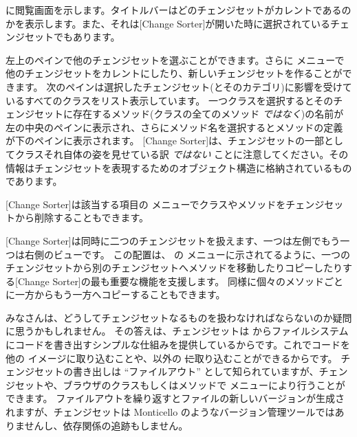 \documentclass[a4paper,10pt,twoside]{book}
\begin{document}
 に閲覧画面を示します。タイトルバーはどのチェンジセットがカレントであるのかを表示します。また、それは[Change Sorter]が開いた時に選択されているチェンジセットでもあります。

左上のペインで他のチェンジセットを選ぶことができます。さらに \actclick メニューで他のチェンジセットをカレントにしたり、新しいチェンジセットを作ることができます。
次のペインは選択したチェンジセット(とそのカテゴリ)に影響を受けているすべてのクラスをリスト表示しています。
一つクラスを選択するとそのチェンジセットに存在するメソッド(クラスの全てのメソッド \emph{ではなく})の名前が左の中央のペインに表示され、さらにメソッド名を選択するとメソッドの定義が下のペインに表示されます。
[Change Sorter]は、チェンジセットの一部としてクラスそれ自体の姿を見せている訳 \emph{ではない} ことに注意してください。その情報はチェンジセットを表現するためのオブジェクト構造に格納されているものであります。

[Change Sorter]は該当する項目の \actclick メニューでクラスやメソッドをチェンジセットから削除することもできます。


[Change Sorter]は同時に二つのチェンジセットを扱えます、一つは左側でもう一つは右側のビューです。
この配置は、  の \actclick メニューに示されてるように、一つのチェンジセットから別のチェンジセットへメソッドを移動したりコピーしたりする[Change Sorter]の最も重要な機能を支援します。
同様に個々のメソッドごとに一方からもう一方へコピーすることもできます。

みなさんは、どうしてチェンジセットなるものを扱わなければならないのか疑問に思うかもしれません。
その答えは、チェンジセットは \pharo からファイルシステムにコードを書き出すシンプルな仕組みを提供しているからです。これでコードを他の \pharo イメージに取り込むことや、\pharo 以外の \st に取り込むことができるからです。
チェンジセットの書き出しは ``ファイルアウト'' として知られていますが、チェンジセットや、ブラウザのクラスもしくはメソッドで \actclick メニューにより行うことができます。
ファイルアウトを繰り返すとファイルの新しいバージョンが生成されますが、チェンジセットは Monticello のようなバージョン管理ツールではありませんし、依存関係の追跡もしません。
\end{document}
